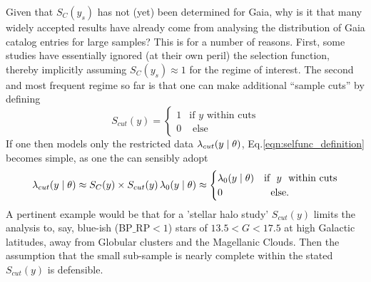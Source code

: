 Given that $S_C(y_s)$ has not (yet) been determined for Gaia, why is it that many %
widely accepted results have already come from analysing the distribution of Gaia catalog entries for large samples? This is for a number of reasons. First, some studies have essentially ignored (at their own peril) the selection function, thereby implicitly assuming $S_C(y_s)\approx 1$ for the regime of interest. The second and most frequent regime so far is that one can make additional ``sample cuts'' by defining
\begin{equation*}
    S_{cut}(y) = \begin{cases} 1 &\mbox{if\ \ } y \mbox{\ \ within cuts} \\ 
0 &\mbox{\ \ else} \end{cases}
\end{equation*}
If one then models only the restricted data $\lambda_{cut}(y\mid\theta)$, Eq.\ref{eqn:selfunc_definition} becomes simple, as one the can sensibly adopt
\begin{equation*}
    \lambda_{cut}(y\mid\theta) \approx S_C(y) \times S_{cut}(y)\, \lambda_0(y\mid \theta) \approx  \begin{cases}  \lambda_0(y\mid \theta) &\mbox{if\ \ } y \mbox{\ \ within cuts} \\ 
0 &\mbox{\ \ else.} \end{cases}
\end{equation*}
A pertinent example would be that for a 'stellar halo study' $S_{cut}(y)$ limits the analysis to, say, blue-ish (BP$\_$RP$<1$) stars of $13.5<G<17.5$ at high Galactic latitudes, away from Globular clusters and the Magellanic Clouds. Then the assumption that the small sub-sample is nearly complete within the stated $S_{cut}(y)$  is defensible.

